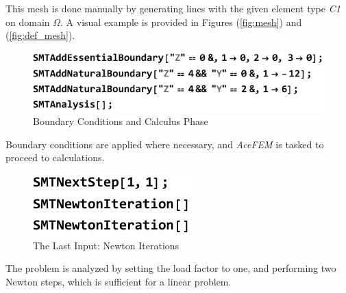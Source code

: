 This mesh is done manually by generating lines with the given element type \textit{C1} on domain \textit{$\Omega$}. A visual example is provided in Figures (\ref{fig:mesh}) and (\ref{fig:def_mesh}).
\clearpage

\begin{figure}[htb]
	\includegraphics{figures/acefem_input_2}
	\caption{Boundary Conditions and Calculus Phase}
	\label{fig:bound}
\end{figure}

Boundary conditions are applied where necessary, and \textit{AceFEM} is tasked to proceed to calculations.

\begin{figure}[htb]
	\includegraphics{figures/acefem_input_3}
	\caption{The Last Input: Newton Iterations }
	\label{fig:newton}
\end{figure}

The problem is analyzed by setting the load factor to one, and performing two Newton steps, which is sufficient for a linear problem.

